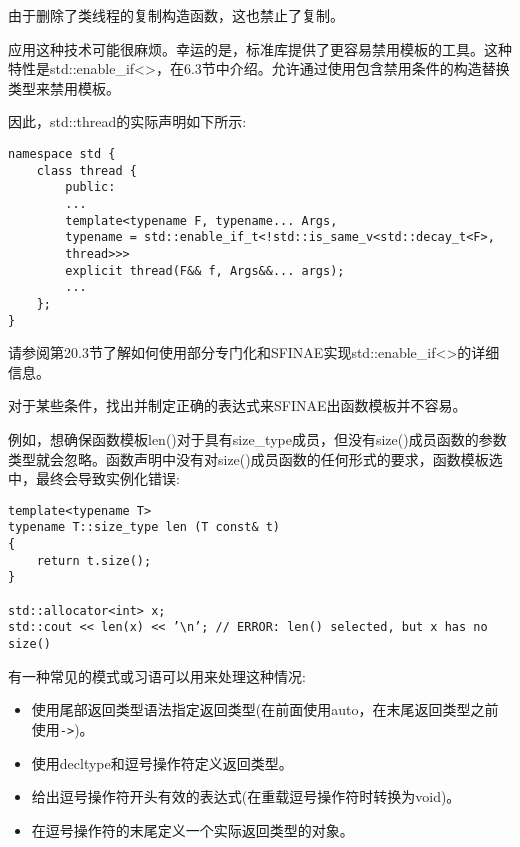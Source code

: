 \begin{tcolorbox}[colback=webgreen!5!white,colframe=webgreen!75!black]
\hspace*{0.75cm}由于删除了类线程的复制构造函数，这也禁止了复制。
\end{tcolorbox}

应用这种技术可能很麻烦。幸运的是，标准库提供了更容易禁用模板的工具。这种特性是std::enable\_if<>，在6.3节中介绍。允许通过使用包含禁用条件的构造替换类型来禁用模板。

因此，std::thread的实际声明如下所示:

\begin{lstlisting}[style=styleCXX]
namespace std {
	class thread {
		public:
		...
		template<typename F, typename... Args,
		typename = std::enable_if_t<!std::is_same_v<std::decay_t<F>,
		thread>>>
		explicit thread(F&& f, Args&&... args);
		...
	};
}
\end{lstlisting}

请参阅第20.3节了解如何使用部分专门化和SFINAE实现std::enable\_if<>的详细信息。



对于某些条件，找出并制定正确的表达式来SFINAE出函数模板并不容易。

例如，想确保函数模板len()对于具有size\_type成员，但没有size()成员函数的参数类型就会忽略。函数声明中没有对size()成员函数的任何形式的要求，函数模板选中，最终会导致实例化错误:

\begin{lstlisting}[style=styleCXX]
template<typename T>
typename T::size_type len (T const& t)
{
	return t.size();
}

std::allocator<int> x;
std::cout << len(x) << ’\n’; // ERROR: len() selected, but x has no size()
\end{lstlisting}

有一种常见的模式或习语可以用来处理这种情况:

\begin{itemize}
\item 
使用尾部返回类型语法指定返回类型(在前面使用auto，在末尾返回类型之前使用\texttt{->})。

\item 
使用decltype和逗号操作符定义返回类型。

\item 
给出逗号操作符开头有效的表达式(在重载逗号操作符时转换为void)。

\item 
在逗号操作符的末尾定义一个实际返回类型的对象。
\end{itemize}

